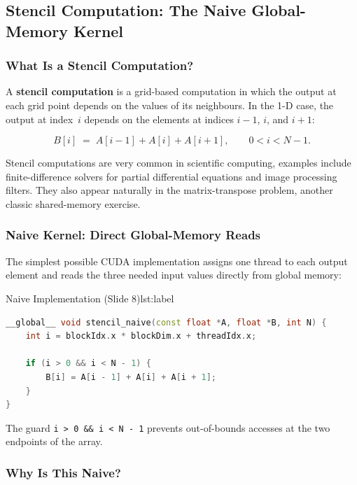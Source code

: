 \subsection{Stencil Computation: The Naive Global-Memory Kernel}

 
\subsubsection{What Is a Stencil Computation?}
 
A \textbf{stencil computation} is a grid-based computation in which the output
at each grid point depends on the values of its neighbours. In the 1-D case,
the output at index~$i$ depends on the elements at indices $i-1$, $i$, and
$i+1$:
 
\[
  B[i] \;=\; A[i-1] + A[i] + A[i+1], \qquad 0 < i < N-1.
\]
 
Stencil computations are very common in scientific computing, examples
include finite-difference solvers for partial differential equations and image
processing filters. They also appear naturally in the matrix-transpose problem,
another classic shared-memory exercise.
 
\subsubsection{Naive Kernel: Direct Global-Memory Reads}
 
The simplest possible CUDA implementation assigns one thread to each output
element and reads the three needed input values directly from global memory:
 

\begin{ppprogram}{Naive Implementation (Slide 8)}{lst:label}
\begin{lstlisting}[language=C++]
__global__ void stencil_naive(const float *A, float *B, int N) {
    int i = blockIdx.x * blockDim.x + threadIdx.x;
    
    if (i > 0 && i < N - 1) {
        B[i] = A[i - 1] + A[i] + A[i + 1];
    }
}
\end{lstlisting}
\end{ppprogram}
 
The guard \texttt{i > 0 \&\& i < N - 1} prevents out-of-bounds accesses at
the two endpoints of the array.
 
\subsubsection{Why Is This Naive?}
 
